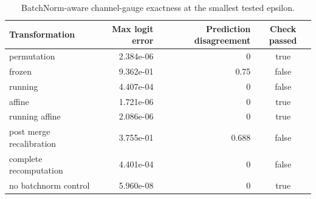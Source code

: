 \begin{table}[t]
\centering
\caption{BatchNorm-aware channel-gauge exactness at the smallest tested epsilon.}
\label{tab:post-iclr-batchnorm-gauge}
\begin{tabular}{lrrc}
\toprule
Transformation & Max logit error & Prediction disagreement & Check passed \\
\midrule
permutation & 2.384e-06 & 0 & true \\
frozen & 9.362e-01 & 0.75 & false \\
running & 4.407e-04 & 0 & false \\
affine & 1.721e-06 & 0 & true \\
running affine & 2.086e-06 & 0 & true \\
post merge recalibration & 3.755e-01 & 0.688 & false \\
complete recomputation & 4.401e-04 & 0 & false \\
no batchnorm control & 5.960e-08 & 0 & true \\
\bottomrule
\end{tabular}
\end{table}
